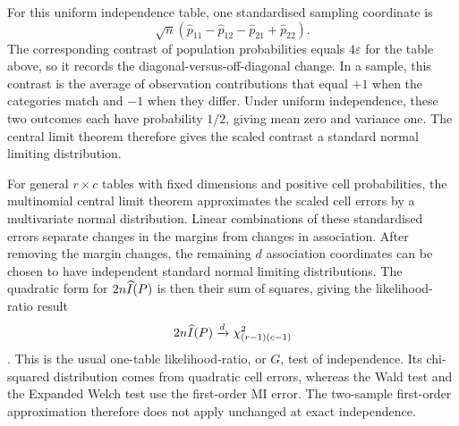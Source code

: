 For this uniform independence table, one standardised sampling coordinate is
\begin{equation*}
 \sqrt n\left(\widehat p_{11}-\widehat p_{12}
                   -\widehat p_{21}+\widehat p_{22}\right).
\end{equation*}
The corresponding contrast of population probabilities equals
\(4\varepsilon\) for the table above, so it records the
diagonal-versus-off-diagonal change. In a sample, this contrast
is the average of observation contributions that equal \(+1\) when the
categories match and \(-1\) when they differ. Under uniform independence,
these two outcomes each have probability \(1/2\), giving mean zero and
variance one. The central limit theorem therefore gives the scaled
contrast a standard normal limiting distribution.

For general \(r\times c\) tables with fixed dimensions and positive cell
probabilities, the multinomial central limit theorem approximates the scaled
cell errors by a multivariate normal distribution. Linear combinations of these
standardised errors separate changes in the margins from changes in
association. After removing the margin changes, the remaining
\(d\) association coordinates can be chosen to have independent standard
normal limiting distributions. The quadratic form for \(2n\widehat I(P)\)
is then their sum of squares, giving the likelihood-ratio result
\begin{equation}
 2n\widehat I(P)\xrightarrow{d}\chi^2_{(r-1)(c-1)}
 \label{eq:independence-chi-squared}
\end{equation}
\citep{wilks1938,brillinger2004}. This is the usual one-table likelihood-ratio,
or \(G\), test of independence. Its chi-squared distribution comes from
quadratic cell errors, whereas the Wald test and the Expanded Welch test use the
first-order MI error. The two-sample first-order approximation therefore
does not apply unchanged at exact independence.

\medskip
{}

